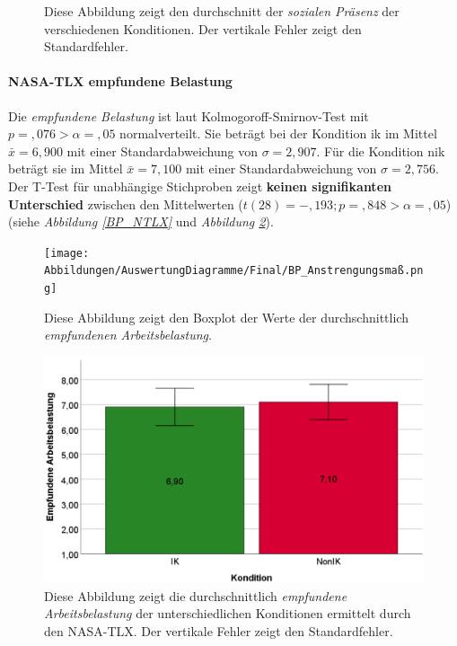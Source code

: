 \documentclass[a4paper,11pt]{article}%
\renewcommand{\\}{\vspace*{0.5\baselineskip} \newline}
\begin{document}
{\begin{figure}[H]
\begin{minipage}[t]{.5\linewidth}
      \caption[Durchschnittliche soziale Präsenz]{Diese Abbildung zeigt den durchschnitt der \textit{sozialen Präsenz} der verschiedenen Konditionen. Der vertikale Fehler zeigt den Standardfehler.}
       \label{SD_SocialPresence_Mittelwerte}
   \end{minipage}
\end{figure}

\newpage

\paragraph{NASA-TLX \glqq{}empfundene Belastung\dq{}}
\label{NASA-TLX}
Die \textit{empfundene Belastung} ist laut  Kolmogoroff-Smirnov-Test mit $p =,076 > \alpha = ,05$ normalverteilt. 
Sie beträgt bei der Kondition \ac{ik} im Mittel $\bar{x} = 6,900$ mit einer Standardabweichung von $\sigma = 2,907$.
Für die Kondition \ac{nik} beträgt sie im Mittel $\bar{x} = 7,100$ mit einer Standardabweichung von $\sigma = 2,756$. 
Der T-Test für unabhängige Stichproben zeigt \textbf{keinen signifikanten Unterschied} zwischen den Mittelwerten ($t(28) = -,193; p =,848 > \alpha = ,05$) (siehe \textit{Abbildung \ref{BP_NTLX}} und \textit{Abbildung \ref{SD_NTLX_Mittelwerte}}).

	\begin{figure}[H]
   \begin{minipage}[t]{.5\linewidth} %
      \texttt{[image: Abbildungen/AuswertungDiagramme/Final/BP\_Anstrengungsmaß.png]}
      \caption[Boxplot der empfundenen Arbeitsbelastung]{Diese Abbildung zeigt den Boxplot der Werte der durchschnittlich \textit{empfundenen Arbeitsbelastung}.}
            \label{BP_NTLX}
   \end{minipage}
   \hspace{.02\linewidth}%
   \begin{minipage}[t]{.5\linewidth} %
     \includegraphics[width=\linewidth]{Abbildungen/AuswertungDiagramme/Final/SD_NTLX_Mittelwerte.png}
      \caption[Durchschnittlich empfundene Arbeitsbelastung]{Diese Abbildung zeigt die durchschnittlich \textit{empfundene Arbeitsbelastung} der unterschiedlichen Konditionen ermittelt durch den NASA-TLX. Der vertikale Fehler zeigt den Standardfehler.}
       \label{SD_NTLX_Mittelwerte}
   \end{minipage}
\end{figure}

}
\end{document}
